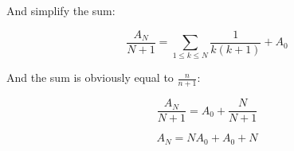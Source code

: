 \documentclass[12pt]{article}
\begin{document}
And simplify the sum:

\begin{equation}
\frac{A_{N}}{N+1} = \sum_{1 \leq k \leq N}\frac{1}{k(k+1)} + A_{0} \nonumber
\end{equation}

And the sum is obviously equal to ${\frac{n}{n+1}}$:

\begin{equation}
\frac{A_{N}}{N+1} = A_{0} + \frac{N}{N+1} \nonumber
\end{equation}

\begin{equation}
A_{N} = NA_{0} + A_{0} + N \nonumber
\end{equation}
\end{document}
